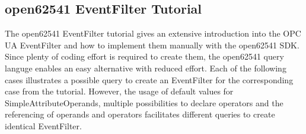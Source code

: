 \documentclass[10pt]{scrreprt}
\begin{document}
\begin{table}[h]
    \centering
    \caption{\textbf{InList and Between Operators}}
    \label{tab:InList and Between Operators}
\end{table}

\subsection{open62541 EventFilter Tutorial}
\label{ref:open62541 EventFilter Tutorial}

The open62541 EventFilter tutorial gives an extensive introduction into the OPC UA EventFilter and how to implement them manually with the open62541 SDK. Since plenty of coding effort is required to create them,
the open62541 query languge enables an easy alternative with reduced effort. Each of the following cases illustrates a possible query to create an EventFilter for the corresponding case from
the tutorial. However, the usage of default values for SimpleAttributeOperands, multiple possibilities to declare operators and the referencing of operands and operators facilitates different queries to create identical EventFilter.
\end{document}
